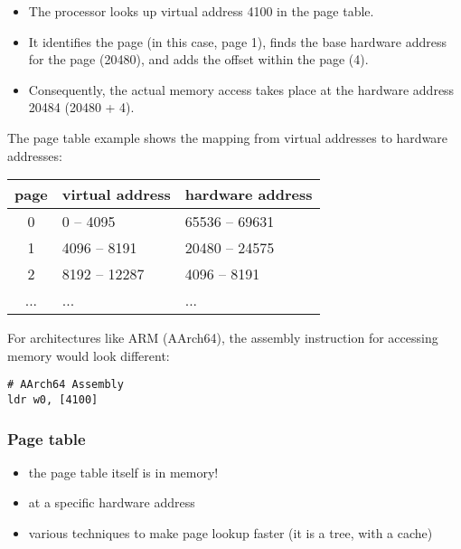 \documentclass[12pt]{article}
\begin{document}
\begin{itemize}
    \item The processor looks up virtual address 4100 in the page table.
    \item It identifies the page (in this case, page 1), finds the base hardware address for the page (20480), and adds the offset within the page (4).
    \item Consequently, the actual memory access takes place at the hardware address 20484 (20480 + 4).
\end{itemize}

The page table example shows the mapping from virtual addresses to hardware addresses:\\

\begin{tabular}{|c|l|l|}
\hline
\textbf{page} & \textbf{virtual address} & \textbf{hardware address} \\
\hline
0 & 0 -- 4095 & 65536 -- 69631 \\
1 & 4096 -- 8191 & 20480 -- 24575 \\
2 & 8192 -- 12287 & 4096 -- 8191 \\
... & ... & ... \\
\hline
\end{tabular}

\vspace{3.5mm}
For architectures like ARM (AArch64), the assembly instruction for accessing memory would look different:

\begin{verbatim}
# AArch64 Assembly
ldr w0, [4100]
\end{verbatim}





\subsubsection{Page table}
\begin{itemize}
    \item the page table itself is in memory!
    \item at a specific hardware address
    \item various techniques to make page lookup faster (it is a tree, with a cache)
\end{itemize}
\end{document}
